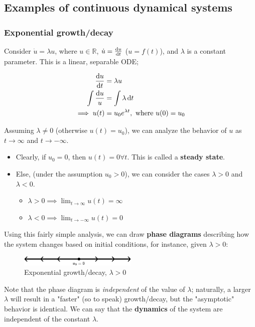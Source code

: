 \documentclass[12pt, oneside]{article}
\begin{document}
\subsection{Examples of continuous dynamical systems}
\subsubsection{Exponential growth/decay}

Consider $\dot{u} = \lambda u$, where $u \in \mathbb{R}$, $\dot{u} = \dv{u}{t}$ ($u = f(t)$), and $\lambda$ is a constant parameter. This is a linear, separable ODE;

\begin{align*}
  \dv{u}{t} &= \lambda u\\
  \int \frac{\dd{u}}{u} &= \int \lambda \dd{t}\\
  \implies u(t) &= u_0 e^{\lambda t}, \text{ where } u(0) = u_0
\end{align*}

Assuming $\lambda \neq 0$ (otherwise $u(t) = u_0$), we can analyze the behavior of $u$ as $t \longrightarrow \infty$ and $t \longrightarrow -\infty$.

\begin{itemize}
  \item Clearly, if $u_0 = 0$, then $u(t) = 0 \forall t$. This is called a \textbf{steady state}.
  \item Else, (under the assumption $u_0 > 0$), we can consider the cases $\lambda > 0$ and $\lambda < 0$.
  \begin{itemize}
    \item $\lambda >0 \implies \lim_{t \to \infty} u(t) = \infty$
    \item $\lambda < 0 \implies \lim_{t \to -\infty} u(t) = 0$
  \end{itemize}
\end{itemize}

Using this fairly simple analysis, we can draw \textbf{phase diagrams} describing how the system changes based on initial conditions, for instance, given $\lambda > 0$:
\begin{figure}[h!]
  \centering
  \includegraphics*[width=0.5\textwidth]{figures/example1-1-1.png}
  \caption{Exponential growth/decay, $\lambda> 0$}
\end{figure}

Note that the phase diagram is \emph{independent} of the value of $\lambda$; naturally, a larger $\lambda$ will result in a "faster" (so to speak) growth/decay, but the "asymptotic" behavior is identical. We can say that the \textbf{dynamics} of the system are independent of the constant $\lambda$.
\end{document}
